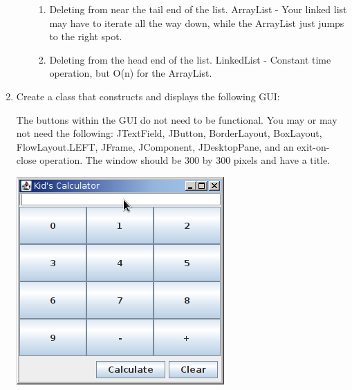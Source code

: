 \documentclass[11pt]{article}
\newenvironment{answer}{\large\lstset{basicstyle=\tiny\ttfamily}\color{white} }{}
\newenvironment{answer}{\large\lstset{basicstyle=\large\ttfamily}\color{red} }{}
\begin{document}
\begin{enumerate}
\begin{enumerate}
\begin{enumerate}
		\item Deleting from near the tail end of the list.
		\begin{answer}
		ArrayList - Your linked list may have to iterate all the way down, while the ArrayList just jumps to the right spot.
		\end{answer}
				
		\item Deleting from the head end of the list.
		\begin{answer}
		LinkedList - Constant time operation, but O(n) for the ArrayList.
		\end{answer}
				
	\end{enumerate}

\end{enumerate}  



\newpage
\item Create a class that constructs and displays the following GUI: \\
\begin{minipage}{0.5\textwidth}
\vspace{-48pt}
The buttons within the GUI do not need to be functional.  You may or may not need the following: JTextField, JButton, BorderLayout, BoxLayout, FlowLayout.LEFT, JFrame, JComponent, JDesktopPane, and an exit-on-close operation.  The window should be 300 by 300 pixels and have a title.
\end{minipage}
\hspace{50px}
\begin{minipage}{0.3\textwidth}
\includegraphics[scale=0.6]{calculator.png}
\end{minipage} \hfill


\end{enumerate}
\end{document}
